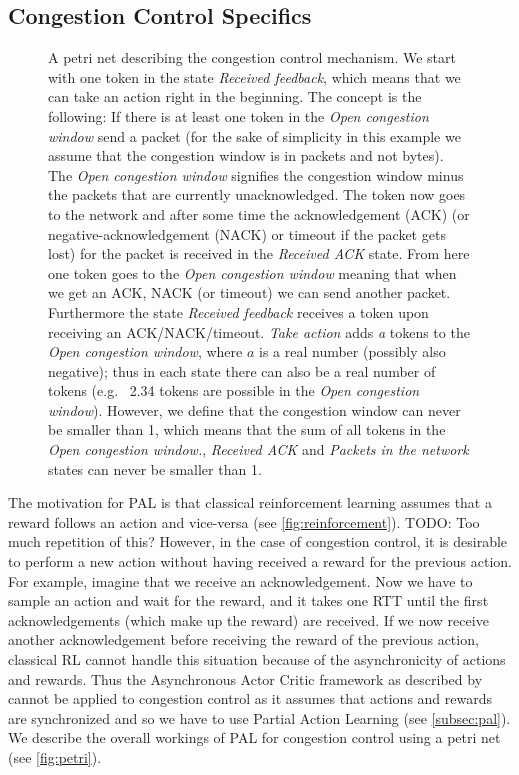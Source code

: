 \documentclass[sigconf]{acmart}
\newcommand\note[2]{{\color{#1}#2}}
\newcommand\todo[1]{{\note{red}{TODO: #1}}}
\begin{document}
\subsection{Congestion Control Specifics}

\begin{figure}



\caption{A petri net describing the congestion control mechanism. We start with one token in the state \textit{Received feedback}, which means that we can take an action right in the beginning. The concept is the following: If there is at least one token in the \textit{Open congestion window} send a packet (for the sake of simplicity in this example we assume that the congestion window is in packets and not bytes). The \textit{Open congestion window} signifies the congestion window minus the packets that are currently unacknowledged. The token now goes to the network and after some time the acknowledgement (ACK) (or negative-acknowledgement (NACK) or timeout if the packet gets lost) for the packet is received in the \textit{Received ACK} state. From here one token goes to the \textit{Open congestion window} meaning that when we get an ACK, NACK (or timeout) we can send another packet. Furthermore the state \textit{Received feedback} receives a token upon receiving an ACK/NACK/timeout. \textit{Take action} adds \textit{a} tokens to the \textit{Open congestion window}, where $a$ is a real number (possibly also negative); thus in each state there can also be a real number of tokens (e.g.~ 2.34 tokens are possible in the \textit{Open congestion window}). However, we define that the congestion window can never be smaller than 1, which means that the sum of all tokens in the \textit{Open congestion window.}, \textit{Received ACK} and \textit{Packets in the network} states can never be smaller than 1.}
\label{fig:petri}
\end{figure}

The motivation for PAL is that classical reinforcement learning assumes that a reward follows an action and vice-versa (see \autoref{fig:reinforcement}). \todo{Too much repetition of this?} However, in the case of congestion control, it is desirable to perform a new action without having received a reward for the previous action. For example, imagine that we receive an acknowledgement. Now we have to sample an action and wait for the reward, and it takes one RTT until the first acknowledgements (which make up the reward) are received. If we now receive another acknowledgement before receiving the reward of the previous action, classical RL cannot handle this situation because of the asynchronicity of actions and rewards. Thus the Asynchronous Actor Critic framework as described by \cite{mnih_asynchronous_2016} cannot be applied to congestion control as it assumes that actions and rewards are synchronized and so we have to use Partial Action Learning (see \autoref{subsec:pal}). We describe the overall workings of PAL for congestion control using a petri net (see \autoref{fig:petri}).
\end{document}
